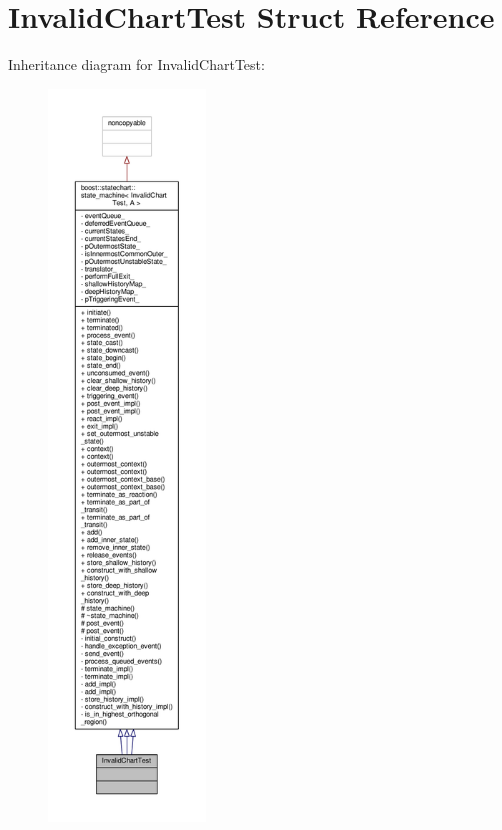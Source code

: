\hypertarget{struct_invalid_chart_test}{}\section{Invalid\+Chart\+Test Struct Reference}
\label{struct_invalid_chart_test}


Inheritance diagram for Invalid\+Chart\+Test\+:
\nopagebreak
\begin{figure}[H]
\begin{center}
\leavevmode
\includegraphics[height=550pt]{struct_invalid_chart_test__inherit__graph}
\end{center}
\end{figure}


